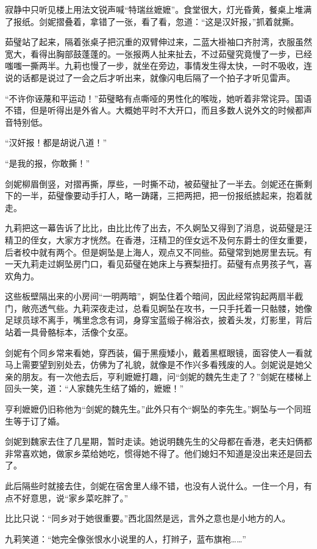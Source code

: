 \par 寂静中只听见楼上用法文锐声喊“特瑞丝嬷嬷”。食堂很大，灯光昏黄，餐桌上堆满了报纸。剑妮摺叠着，拿错了一张，看了看，忽道：“这是汉奸报，”抓着就撕。
\par 茹璧站了起来，隔着张桌子把沉重的双臂伸过来，二蓝大褂袖口齐肘湾，衣服虽然宽大，看得出胸部鼓蓬蓬的。一张报两人扯来扯去，不过茹璧究竟慢了一步，已经嗤嗤一撕两半。九莉也慢了一步，就坐在旁边，事情发生得太快，一时不吸收，连说的话都是说过了一会之后才听出来，就像闪电后隔了一个拍子才听见雷声。
\par “不许你诬蔑和平运动！”茹璧略有点嘶哑的男性化的喉咙，她听着非常诧异。国语不错，但是听得出是外省人。大概她平时不大开口，而且多数人说外文的时候都声音特别低。
\par “汉奸报！都是胡说八道！”
\par “是我的报，你敢撕！”
\par 剑妮柳眉倒竖，对摺再撕，厚些，一时撕不动，被茹璧扯了一半去。剑妮还在撕剩下的一半，茹璧像要动手打人，略一踌躇，三把两把，把一份报纸掳起来，抱着就走。
\par 九莉把这一幕告诉了比比，由比比传了出去，不久婀坠又得到了消息，说茹璧是汪精卫的侄女，大家方才恍然。在香港，汪精卫的侄女远不及何东爵士的侄女重要，后者校中就有两个。但是婀坠是上海人，观点又不同些。茹璧常到她房里去玩。有一天九莉走过婀坠房门口，看见茹璧在她床上与赛梨扭打。茹璧有点男孩子气，喜欢角力。
\par 这些板壁隔出来的小房间“一明两暗”，婀坠住着个暗间，因此经常钩起两扇半截门，敞亮透气些。九莉深夜走过，总看见婀坠在攻书，一只手托着一只骷髅，她像足球员球不离手，嘴里念念有词，身穿宝蓝缎子棉浴衣，披着头发，灯影里，背后站着一具骨骼标本，活像个女巫。
\par 剑妮有个同乡常来看她，穿西装，偏于黑瘦矮小，戴着黑框眼镜，面容使人一看就马上需要望到别处去，仿佛为了礼貌，就像是不作兴多看残废的人。剑妮说是她父亲的朋友。有一次他去后，亨利嬷嬷打趣，问“剑妮的魏先生走了？”剑妮在楼梯上回头一笑，道：“人家魏先生结了婚的，嬷嬷！”
\par 亨利嬷嬷仍旧称他为“剑妮的魏先生。”此外只有个“婀坠的李先生。”婀坠与一个同班生等于订了婚。
\par 剑妮到魏家去住了几星期，暂时走读。她说明魏先生的父母都在香港，老夫妇俩都非常喜欢她，做家乡菜给她吃，惯得她不得了。他们媳妇不知道是没出来还是回去了。
\par 此后隔些时就接去住，剑妮在宿舍里人缘不错，也没有人说什么。一住一个月，有点不好意思，说“家乡菜吃胖了。”
\par 比比只说：“同乡对于她很重要。”西北固然是远，言外之意也是小地方的人。
\par 九莉笑道：“她完全像张恨水小说里的人，打辫子，蓝布旗袍……”

